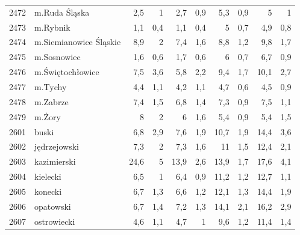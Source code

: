 \begin{center}
\begin{longtable}{lp{3cm}rrrrrrrr}
2472 & m.Ruda Śląska           & 2,5     & 1           & 2,7      & 0,9          & 5,3      & 0,9          & 5        & 1            \\
2473 & m.Rybnik                & 1,1     & 0,4         & 1,1      & 0,4          & 5        & 0,7          & 4,9      & 0,8          \\
2474 & m.Siemianowice Śląskie  & 8,9     & 2           & 7,4      & 1,6          & 8,8      & 1,2          & 9,8      & 1,7          \\
2475 & m.Sosnowiec             & 1,6     & 0,6         & 1,7      & 0,6          & 6        & 0,7          & 6,7      & 0,9          \\
2476 & m.Świętochłowice        & 7,5     & 3,6         & 5,8      & 2,2          & 9,4      & 1,7          & 10,1     & 2,7          \\
2477 & m.Tychy                 & 4,4     & 1,1         & 4,2      & 1,1          & 4,7      & 0,6          & 4,5      & 0,9          \\
2478 & m.Zabrze                & 7,4     & 1,5         & 6,8      & 1,4          & 7,3      & 0,9          & 7,5      & 1,1          \\
2479 & m.Żory                  & 8       & 2           & 6        & 1,6          & 5,4      & 0,9          & 5,4      & 1,5          \\
2601 & buski                   & 6,8     & 2,9         & 7,6      & 1,9          & 10,7     & 1,9          & 14,4     & 3,6          \\
2602 & jędrzejowski            & 7,3     & 2           & 7,3      & 1,6          & 11       & 1,5          & 12,4     & 2,1          \\
2603 & kazimierski             & 24,6    & 5           & 13,9     & 2,6          & 13,9     & 1,7          & 17,6     & 4,1          \\
2604 & kielecki                & 6,5     & 1           & 6,4      & 0,9          & 11,2     & 1,2          & 12,7     & 1,1          \\
2605 & konecki                 & 6,7     & 1,3         & 6,6      & 1,2          & 12,1     & 1,3          & 14,4     & 1,9          \\
2606 & opatowski               & 6,7     & 1,4         & 7,2      & 1,3          & 14,1     & 2,1          & 16,2     & 2,9          \\
2607 & ostrowiecki             & 4,6     & 1,1         & 4,7      & 1            & 9,6      & 1,2          & 11,4     & 1,4          \\

\end{longtable}
\end{center}
